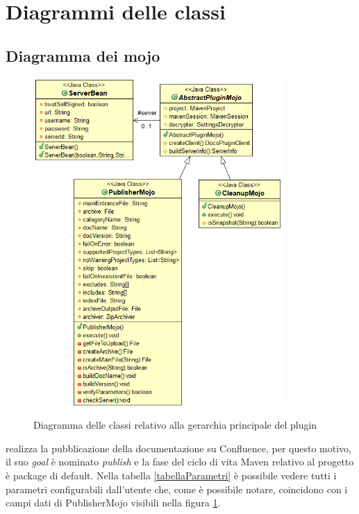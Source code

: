 \section{Diagrammi delle classi}
\label{sec:diagrammi-classi}

\subsection{Diagramma dei mojo}

\begin{figure}[H]
    \centering
    \includegraphics[width=0.85\textwidth]{immagini/mojo-gerarchy.png}\\
    \caption{Diagramma delle classi relativo alla gerarchia principale del plugin}
    \label{diagrammaMojo}
\end{figure}

 realizza la pubblicazione della documentazione su Confluence, per questo motivo, il suo \emph{goal} è nominato \emph{publish} e la fase del ciclo di vita Maven relativo al progetto è package di default.
Nella tabella \ref{tabellaParametri} è possibile vedere tutti i parametri configurabili dall'utente che, come è possibile notare, coincidono con i campi dati di PublisherMojo visibili nella figura \ref{diagrammaMojo}.

